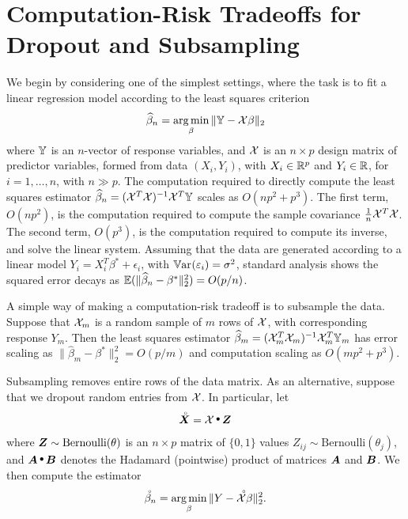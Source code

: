 \section{Computation-Risk Tradeoffs for Dropout and Subsampling}
\label{sec:subsampling}

We begin by considering one of the simplest settings, where
the task is to fit a linear regression model according to the least squares
criterion
\begin{equation}
\widehat \beta_n = \mathop{\text{\rm arg\,min}}_\beta \|\mathbb{Y} - \mathcal{X}\beta\|_2
\end{equation}
where $\mathbb{Y}$ is an $n$-vector of response variables, and $\mathcal{X}$ is an
$n\times p$ design matrix of predictor variables, formed from data
$(X_i, Y_i)$, with $X_i\in{\mathbb R}^p$ and $Y_i\in{\mathbb R}$, for
$i=1,\ldots, n$, with $n\gg p$.  The computation required
to directly compute the least squares
estimator $\widehat\beta_n = (\mathcal{X}^T \mathcal{X})^{-1} \mathcal{X}^T \mathbb{Y}$ scales as
$O(np^2 + p^3)$.  The first term, $O(np^2)$, is the computation
required to compute the sample covariance $\frac{1}{n} \mathcal{X}^T \mathcal{X}$.
The second term, $O(p^3)$, is the computation required to compute its
inverse, and solve the linear system.
Assuming that the data are generated according to a linear model
$Y_i = X_i^T \beta^* + \epsilon_i$, with $\mathop{\mathbb{V}\textrm{ar}}\kern.1ex(\varepsilon_i) =
\sigma^2$, standard analysis shows the squared error decays as
${\mathbb E}(\|\widehat\beta_n - \beta^*\|_2^2) = O(p/n)$.

A simple way of making a computation-risk tradeoff is to 
subsample the data.  Suppose that $\mathcal{X}_m$ is a random sample
of $m$ rows of $\mathcal{X}$, with corresponding response $Y_m$.
Then the least squares estimator $\widehat \beta_m =
(\mathcal{X}_m^T \mathcal{X}_m)^{-1} \mathcal{X}_m^T \mathbb{Y}_m$ 
has error scaling as $\|\hat\beta_m - \beta^*\|_2^2 = O(p/m)$
and computation scaling as $O(m p^2 + p^3)$.  

Subsampling removes entire rows of the data matrix.  As an alternative, suppose that we dropout random entries from $\mathcal{X}$.
In particular, let 
\begin{equation}
\Xdrop = \X \hadamard \bZ
\end{equation}
where $\mbox{\boldmath$Z$} \sim \text{Bernoulli}(\theta)$ is an $n\times p$ matrix of
$\{0,1\}$ values $Z_{ij} \sim \text{Bernoulli}(\theta_j)$, and 
$\mbf{A}\hadamard \mbf{B}$ denotes the Hadamard (pointwise) product
of matrices $\mbox{\boldmath$A$}$ and $\mbox{\boldmath$B$}$.  We then compute the
estimator
\begin{equation}
\accentset{\;\circ}{\beta}_n = \mathop{\text{\rm arg\,min}}_\beta \|Y - \accentset{\;\circ}{\mathcal{X}} \beta\|_2 ^2.
\end{equation}

